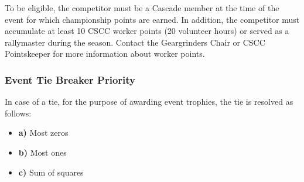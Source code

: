 To be eligible, the competitor must be a Cascade member at the time of the event for which championship points are earned. In addition, the competitor must accumulate at least 10 CSCC worker points (20 volunteer hours) or served as a rallymaster during the season. Contact the Geargrinders Chair or CSCC Pointskeeper for more information about worker points.

\subsubsection{Event Tie Breaker Priority}
In case of a tie, for the purpose of awarding event trophies, the tie is resolved as follows:
\begin{itemize}
\item \textbf{a)} Most zeros
\item \textbf{b)} Most ones
\item \textbf{c)} Sum of squares
\end{itemize}
